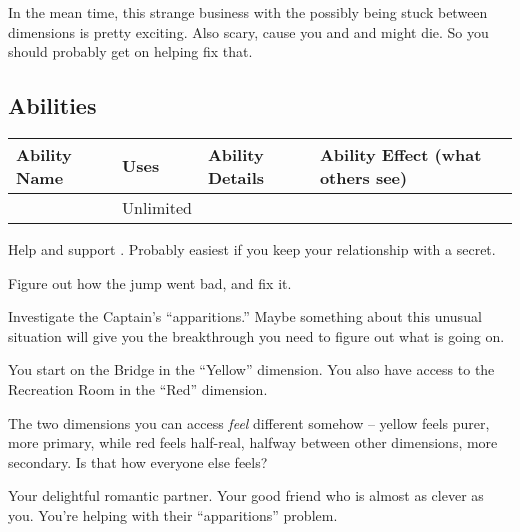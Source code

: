 \documentclass[char]{TMFHope}
\begin{document}
In the mean time, this strange business with the \pNew{} possibly being stuck between dimensions is pretty exciting. Also scary, cause you and \cMed{} and \cXO{} might die. So you should probably get on helping fix that.

\subsection*{Abilities}
\begin{tabular}{|p{3cm}|p{1.5cm}|p{8cm}|p{3.5cm}|} 
 \hline
 \textbf{Ability Name} & \textbf{Uses} & \textbf{Ability Details} & \textbf{Ability Effect (what others see)} \\ 
\hline
 \aEngineering{\MYname} & Unlimited & \aEngineering{\MYtext} & \aEngineering{\MYeffect}\\ 
 \hline
\end{tabular}

\begin{itemz}[Goals]
	\item Help and support \cXO{}. Probably easiest if you keep your relationship with \cXO{\them} a secret.
	\item Figure out how the jump went bad, and fix it.
	\item Investigate the Captain's ``apparitions.''  Maybe something about this unusual situation will give you the breakthrough you need to figure out what is going on.
\end{itemz}

\begin{itemz}[Notes]
	\item You start on the Bridge in the ``Yellow'' dimension. You also have access to the Recreation Room in the ``Red'' dimension.
	\item The two dimensions you can access {\em feel} different somehow -- yellow feels purer, more primary, while red feels half-real, halfway between other dimensions, more secondary.  Is that how everyone else feels?
\end{itemz}

\begin{contacts}
	\contact{\cXO{}} Your delightful romantic partner. 
	\contact{\cMed{}} Your good friend who is almost as clever as you.
	\contact{\cCap{}}You're helping \cCap{\them} with their ``apparitions'' problem.
\end{contacts}
\end{document}
